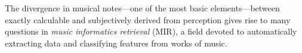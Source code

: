 The divergence in musical notes---one of the most basic elements---between exactly calculable and subjectively derived from perception gives rise to many questions in \textit{music informatics retrieval} (MIR), a field devoted to automatically extracting data and classifying features from works of music.